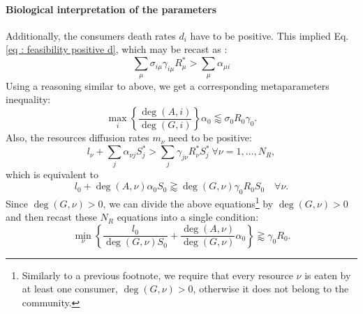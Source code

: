 \documentclass[12pt, titlepage, twoside, openright]{report}
\begin{document}
\paragraph{Biological interpretation of the parameters}
Additionally, the consumers death rates $d_i$ have to be positive. This implied Eq.\eqref{eq : feasibility positive d}, which may be recast as :
\begin{equation}
\sum_\mu \sigma_{i\mu}\gamma_{i\mu}R^*_\mu > \sum_\mu \alpha_{\mu i}
\end{equation}
Using a reasoning similar to above, we get a corresponding metaparameters inequality:
\begin{equation} \label{eq : feasability positivity d}
{
\max_i\left\{\frac{\deg(A,i)}{\deg(G,i)}\right\} \alpha_0 \lessapprox \sigma_0R_0 \gamma_0
}.
\end{equation}
Also, the resources diffusion rates $m_\nu$ need to be positive:
\begin{equation}
l_\nu + \sum_j \alpha_{\nu j} S^*_j > \sum_j \gamma_{j\nu}R^*_\nu S^*_j \ \forall \nu=1,\dots,N_R,
\end{equation}
which is equivalent to
\begin{equation}
l_0 + \deg(A, \nu) \alpha_0 S_0 \gtrapprox \deg(G,\nu) \gamma_0 R_0 S_0 \quad \forall \nu.
\end{equation}
Since $\deg(G,\nu)>0$, we can divide the above equations\footnote{Similarly to a previous footnote, we require that every resource $\nu$ is eaten by at least one consumer, \ie $\deg(G,\nu)>0$, otherwise it does not belong to the community.} by $\deg(G,\nu)>0$ and then recast these $N_R$ equations into a single condition:
\begin{equation} \label{eq : feasability positivity m}
\min_\nu\left\{\frac{l_0}{\deg(G,\nu) S_0} + \frac{\deg(A,\nu)}{\deg(G,\nu)}\alpha_0\right\} \gtrapprox \gamma_0 R_0.
\end{equation}
\end{document}
